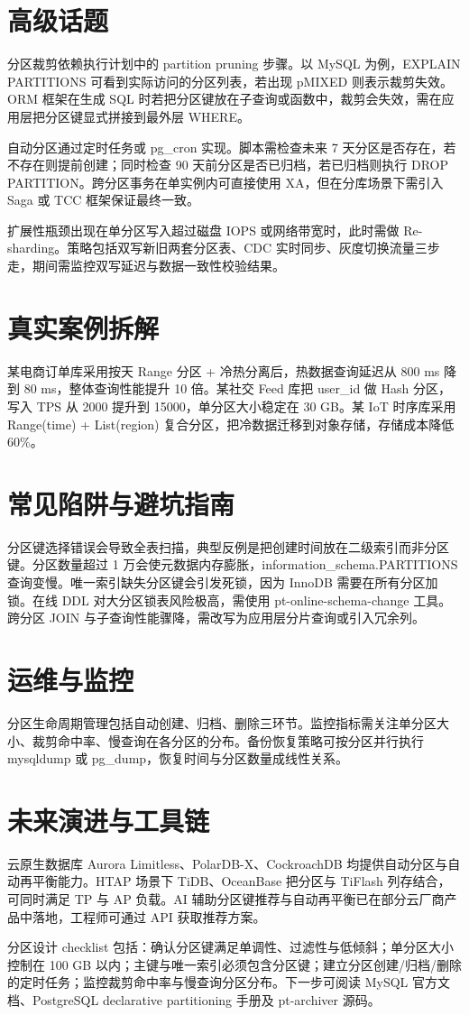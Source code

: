 \chapter{高级话题}
分区裁剪依赖执行计划中的 partition pruning 步骤。以 MySQL 为例，EXPLAIN PARTITIONS 可看到实际访问的分区列表，若出现 pMIXED 则表示裁剪失效。ORM 框架在生成 SQL 时若把分区键放在子查询或函数中，裁剪会失效，需在应用层把分区键显式拼接到最外层 WHERE。\par
自动分区通过定时任务或 pg\_{}cron 实现。脚本需检查未来 7 天分区是否存在，若不存在则提前创建；同时检查 90 天前分区是否已归档，若已归档则执行 DROP PARTITION。跨分区事务在单实例内可直接使用 XA，但在分库场景下需引入 Saga 或 TCC 框架保证最终一致。\par
扩展性瓶颈出现在单分区写入超过磁盘 IOPS 或网络带宽时，此时需做 Re-sharding。策略包括双写新旧两套分区表、CDC 实时同步、灰度切换流量三步走，期间需监控双写延迟与数据一致性校验结果。\par
\chapter{真实案例拆解}
某电商订单库采用按天 Range 分区 + 冷热分离后，热数据查询延迟从 800 ms 降到 80 ms，整体查询性能提升 10 倍。某社交 Feed 库把 user\_{}id 做 Hash 分区，写入 TPS 从 2000 提升到 15000，单分区大小稳定在 30 GB。某 IoT 时序库采用 Range(time) + List(region) 复合分区，把冷数据迁移到对象存储，存储成本降低 60\%{}。\par
\chapter{常见陷阱与避坑指南}
分区键选择错误会导致全表扫描，典型反例是把创建时间放在二级索引而非分区键。分区数量超过 1 万会使元数据内存膨胀，information\_{}schema.PARTITIONS 查询变慢。唯一索引缺失分区键会引发死锁，因为 InnoDB 需要在所有分区加锁。在线 DDL 对大分区锁表风险极高，需使用 pt-online-schema-change 工具。跨分区 JOIN 与子查询性能骤降，需改写为应用层分片查询或引入冗余列。\par
\chapter{运维与监控}
分区生命周期管理包括自动创建、归档、删除三环节。监控指标需关注单分区大小、裁剪命中率、慢查询在各分区的分布。备份恢复策略可按分区并行执行 mysqldump 或 pg\_{}dump，恢复时间与分区数量成线性关系。\par
\chapter{未来演进与工具链}
云原生数据库 Aurora Limitless、PolarDB-X、CockroachDB 均提供自动分区与自动再平衡能力。HTAP 场景下 TiDB、OceanBase 把分区与 TiFlash 列存结合，可同时满足 TP 与 AP 负载。AI 辅助分区键推荐与自动再平衡已在部分云厂商产品中落地，工程师可通过 API 获取推荐方案。\par
分区设计 checklist 包括：确认分区键满足单调性、过滤性与低倾斜；单分区大小控制在 100 GB 以内；主键与唯一索引必须包含分区键；建立分区创建/归档/删除的定时任务；监控裁剪命中率与慢查询分区分布。下一步可阅读 MySQL 官方文档、PostgreSQL declarative partitioning 手册及 pt-archiver 源码。\par
